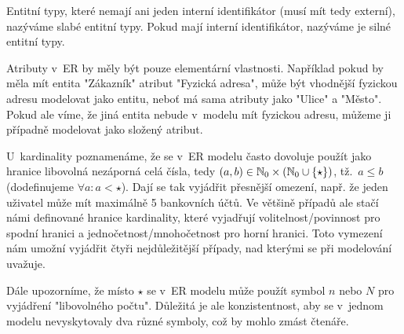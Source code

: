 Entitní typy, které nemají ani jeden interní identifikátor (musí mít tedy externí), nazýváme slabé entitní typy.
Pokud mají interní identifikátor, nazýváme je silné entitní typy.

Atributy v~ER by měly být pouze elementární vlastnosti.
Například pokud by měla mít entita "Zákazník" atribut "Fyzická adresa", může být vhodnější fyzickou adresu modelovat jako entitu, neboť má sama atributy jako "Ulice" a "Město".
Pokud ale víme, že jiná entita nebude v~modelu mít fyzickou adresu, můžeme ji případně modelovat jako složený atribut.

U~kardinality poznamenáme, že se v~ER modelu často dovoluje použít jako hranice libovolná nezáporná celá čísla, tedy $(a, b)\in \mathbb N_0\times \left(\mathbb N_0 \cup \left\{\star\right\}\right)$, tž.~$a\leq b$ (dodefinujeme $\forall a\colon a < \star$).
Dají se tak vyjádřit přesnější omezení, např. že jeden uživatel může mít maximálně 5 bankovních účtů.
Ve většině případů ale stačí námi definované hranice kardinality, které vyjadřují volitelnost/povinnost pro spodní hranici a jednočetnost/mnohočetnost pro horní hranici.
Toto vymezení nám umožní vyjádřit čtyři nejdůležitější případy, nad kterými se při modelování uvažuje.

Dále upozorníme, že místo $\star$ se v~ER modelu může použít symbol $n$ nebo $N$ pro vyjádření "libovolného počtu".
Důležitá je ale konzistentnost, aby se v~jednom modelu nevyskytovaly dva různé symboly, což by mohlo zmást čtenáře.

